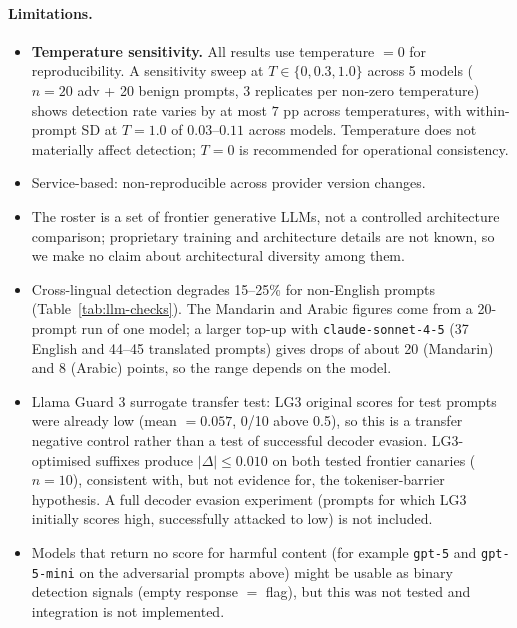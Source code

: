 \documentclass{article}
\begin{document}
\paragraph{Limitations.}
\begin{itemize}
\item \textbf{Temperature sensitivity.} All results use temperature $= 0$ for reproducibility. A sensitivity sweep at $T \in \{0, 0.3, 1.0\}$ across 5 models ($n = 20$ adv + 20 benign prompts, 3 replicates per non-zero temperature) shows detection rate varies by at most $7$ pp across temperatures, with within-prompt SD at $T = 1.0$ of $0.03$--$0.11$ across models. Temperature does not materially affect detection; $T = 0$ is recommended for operational consistency.
\item Service-based: non-reproducible across provider version changes.
\item The roster is a set of frontier generative LLMs, not a controlled architecture comparison; proprietary training and architecture details are not known, so we make no claim about architectural diversity among them.
\item Cross-lingual detection degrades 15--25\% for non-English prompts (Table~\ref{tab:llm-checks}). The Mandarin and Arabic figures come from a 20-prompt run of one model; a larger top-up with \texttt{claude-sonnet-4-5} (37 English and 44--45 translated prompts) gives drops of about 20 (Mandarin) and 8 (Arabic) points, so the range depends on the model.
\item Llama Guard 3 surrogate transfer test: LG3 original scores for test prompts were already low (mean $= 0.057$, 0/10 above 0.5), so this is a transfer negative control rather than a test of successful decoder evasion. LG3-optimised suffixes produce $|\Delta| \leq 0.010$ on both tested frontier canaries ($n = 10$), consistent with, but not evidence for, the tokeniser-barrier hypothesis. A full decoder evasion experiment (prompts for which LG3 initially scores high, successfully attacked to low) is not included.
\item Models that return no score for harmful content (for example \texttt{gpt-5} and \texttt{gpt-5-mini} on the adversarial prompts above) might be usable as binary detection signals (empty response $=$ flag), but this was not tested and integration is not implemented.
\end{itemize}
\end{document}
